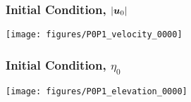 \begin{frame}[t]
  \frametitle{Initial Condition, $|{\boldsymbol{u}}_0|$}
\vspace{-0.2in}
  \begin{center}
    \texttt{[image: figures/P0P1\_velocity\_0000]}
  \end{center}
\end{frame}

\begin{frame}[t]
  \frametitle{Initial Condition, $\eta_0$}
\vspace{-0.2in}
  \begin{center}
    \texttt{[image: figures/P0P1\_elevation\_0000]}
  \end{center}
\end{frame}
